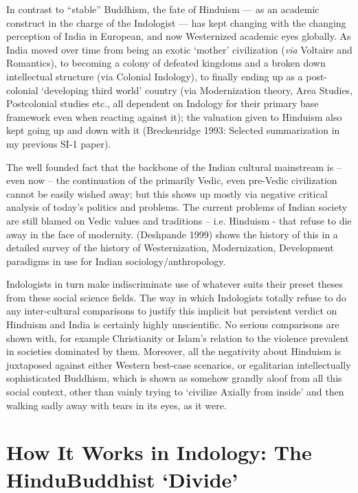 In contrast to “stable” Buddhism, the fate of Hinduism --- as an academic construct in the charge of the Indologist --- has kept changing with the changing perception of India in European, and now Westernized academic eyes globally. As India moved over time from being an exotic ‘mother’ civilization (\textit{via} Voltaire and Romantics), to becoming a colony of defeated kingdoms and a broken down intellectual structure (via Colonial Indology), to finally ending up as a post-colonial ‘developing third world’ country (via Modernization theory, Area Studies, Postcolonial studies etc., all dependent on Indology for their primary base framework even when reacting against it); the valuation given to Hinduism also kept going up and down with it (Breckenridge 1993: Selected summarization in my previous SI-1 paper).

The well founded fact that the backbone of the Indian cultural mainstream is – even now – the continuation of the primarily Vedic, even pre-Vedic civilization cannot be easily wished away; but this shows up mostly via negative critical analysis of today’s politics and problems. The current problems of Indian society are still blamed on Vedic values and traditions – i.e. Hinduism - that refuse to die away in the face of modernity. (Deshpande 1999) shows the history of this in a detailed survey of the history of Westernization, Modernization, Development paradigms in use for Indian sociology/anthropology.

Indologists in turn make indiscriminate use of whatever suits their preset theses from these social science fields. The way in which Indologists totally refuse to do any inter-cultural comparisons to justify this implicit but persistent verdict on Hinduism and India is certainly highly unscientific. No serious comparisons are shown with, for example Christianity or Islam’s relation to the violence prevalent in societies dominated by them. Moreover, all the negativity about Hinduism is juxtaposed against either Western best-case scenarios, or egalitarian intellectually sophisticated Buddhism, which is shown as somehow grandly aloof from all this social context, other than vainly trying to ‘civilize Axially from inside’ and then walking sadly away with tears in its eyes, as it were.


\section*{How It Works in Indology: The Hindu\hfill \break Buddhist ‘Divide’}

